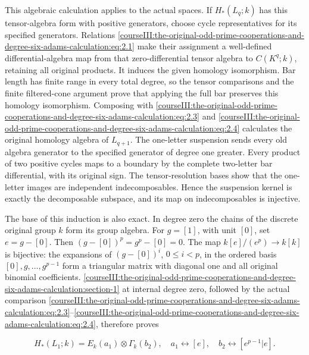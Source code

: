 This algebraic calculation applies to the actual spaces. If \(H_*(L_q;k)\) has this tensor-algebra form with positive generators, choose cycle representatives for its specified generators. Relations \eqref{courseIII:the-original-odd-prime-cooperations-and-degree-six-adams-calculation:eq:2.1} make their assignment a well-defined differential-algebra map from that zero-differential tensor algebra to \(C(K^q;k)\), retaining all original products. It induces the given homology isomorphism. Bar length has finite range in every total degree, so the tensor comparisons and the finite filtered-cone argument prove that applying the full bar preserves this homology isomorphism. Composing with \eqref{courseIII:the-original-odd-prime-cooperations-and-degree-six-adams-calculation:eq:2.3} and \eqref{courseIII:the-original-odd-prime-cooperations-and-degree-six-adams-calculation:eq:2.4} calculates the original homology algebra of \(L_{q+1}\). The one-letter suspension sends every old algebra generator to the specified generator of degree one greater. Every product of two positive cycles maps to a boundary by the complete two-letter bar differential, with its original sign. The tensor-resolution bases show that the one-letter images are independent indecomposables. Hence the suspension kernel is exactly the decomposable subspace, and its map on indecomposables is injective.

The base of this induction is also exact. In degree zero the chains of the discrete original group \(k\) form its group algebra. For \(g=[1]\), with unit \([0]\), set \(e=g-[0]\). Then \((g-[0])^p=g^p-[0]=0\). The map \(k[e]/(e^p)\to k[k]\) is bijective: the expansions of \((g-[0])^i\), \(0\leq i<p\), in the ordered basis \([0],g,\ldots,g^{p-1}\) form a triangular matrix with diagonal one and all original binomial coefficients. \cref{courseIII:the-original-odd-prime-cooperations-and-degree-six-adams-calculation:section-1} at internal degree zero, followed by the actual comparison \eqref{courseIII:the-original-odd-prime-cooperations-and-degree-six-adams-calculation:eq:2.3}--\eqref{courseIII:the-original-odd-prime-cooperations-and-degree-six-adams-calculation:eq:2.4}, therefore proves

\begin{equation}
H_*(L_1;k)=E_k(a_1)\otimes\Gamma_k(b_2),
 \quad a_1\leftrightarrow[e],\quad b_2\leftrightarrow[e^{p-1}|e].
 \label{courseIII:the-original-odd-prime-cooperations-and-degree-six-adams-calculation:eq:3.3}
\end{equation}

